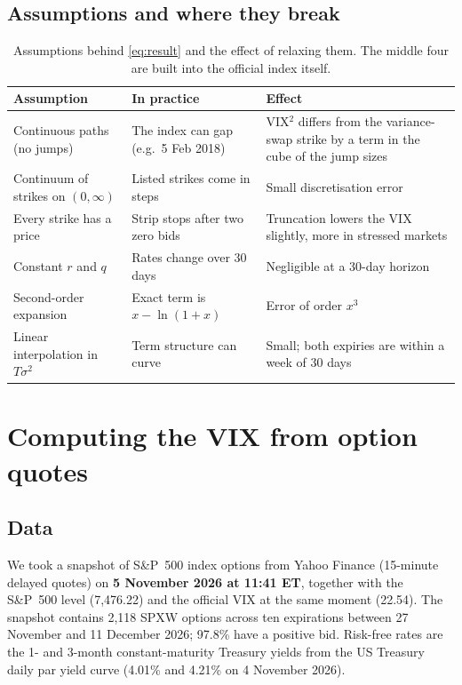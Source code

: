 \documentclass[12pt]{article}
\begin{document}
\subsection{Assumptions and where they break}

\begin{table}[H]
\centering
\small
\begin{tabular}{@{}p{3.7cm}p{4.5cm}p{5.4cm}@{}}
\toprule
\textbf{Assumption} & \textbf{In practice} & \textbf{Effect}\\
\midrule
Continuous paths (no jumps) & The index can gap (e.g.\ 5 Feb 2018) & VIX$^2$ differs from the variance-swap strike by a term in the cube of the jump sizes \cite{carrwu}\\
Continuum of strikes on $(0,\infty)$ & Listed strikes come in steps & Small discretisation error\\
Every strike has a price & Strip stops after two zero bids & Truncation lowers the VIX slightly, more in stressed markets\\
Constant $r$ and $q$ & Rates change over 30 days & Negligible at a 30-day horizon\\
Second-order expansion & Exact term is $x-\ln(1+x)$ & Error of order $x^3$\\
Linear interpolation in $T\sigma^2$ & Term structure can curve & Small; both expiries are within a week of 30 days\\
\bottomrule
\end{tabular}
\caption{Assumptions behind \eqref{eq:result} and the effect of relaxing them. The middle four are built into the official index itself.}
\label{tab:assumptions}
\end{table}

\section{Computing the VIX from option quotes}

\subsection{Data}

We took a snapshot of S\&P~500 index options from Yahoo Finance (15-minute delayed quotes) on \textbf{5 November 2026 at 11:41 ET}, together with the S\&P~500 level (7,476.22) and the official VIX at the same moment (22.54). The snapshot contains 2,118 SPXW options across ten expirations between 27 November and 11 December 2026; 97.8\% have a positive bid. Risk-free rates are the 1- and 3-month constant-maturity Treasury yields from the US Treasury daily par yield curve (4.01\% and 4.21\% on 4 November 2026).
\end{document}
